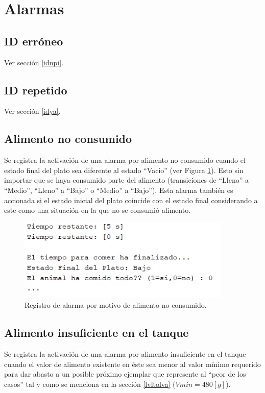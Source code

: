\section{Alarmas}

\subsection{ID erróneo}
Ver sección \ref{idnpi}.

\subsection{ID repetido}
Ver sección \ref{idya}.

\subsection{Alimento no consumido}

Se registra la activación de una alarma por alimento no consumido cuando el estado final del plato sea diferente al estado ``Vacio'' (ver Figura \ref{eatenalpng}). Esto sin importar que se haya consumido parte del alimento (transiciones de ``Lleno'' a ``Medio'', ``Lleno'' a ``Bajo'' o ``Medio'' a ``Bajo'').
Esta alarma también es accionada si el estado inicial del plato coincide con el estado final considerando a este como una situación en la que no se consumió alimento.

\begin{figure}[H]
    \centering
    \includegraphics[scale=1.25]{img/eatenal.png}
    \caption{Registro de alarma por motivo de alimento no consumido.}
    \label{eatenalpng}
\end{figure}

\subsection{Alimento insuficiente en el tanque}

Se registra la activación de una alarma por alimento insuficiente en el tanque cuando el valor de alimento existente en éste sea menor al valor mínimo requerido para dar abasto a un posible próximo ejemplar que represente al ``peor de los casos'' tal y como se menciona en la sección \ref{lvltolva} ($Vmin=480[g]$).\\


